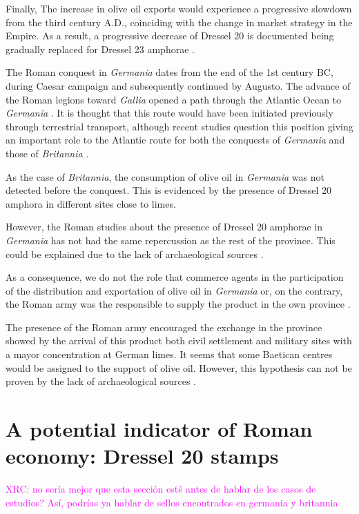 \documentclass[review]{elsarticle}
\newcommand{\memo}[2]{\textcolor{#1}{#2}}
\newcommand{\xavi}[1]{\memo{magenta}{XRC: #1\\}}
\begin{document}
Finally, The increase in olive oil exports would experience a progressive slowdown from the third century A.D., coinciding with the change in market strategy in the Empire. As a result, a progressive decrease of Dressel 20 is documented being gradually replaced for Dressel 23 amphorae \citep{rodriguez1991aceite,millet_anforas_1998}.


The Roman conquest in \textit{Germania} dates from the end of the 1st century BC, during Caesar campaign and subsequently continued by Augusto. The advance of the Roman legions toward \textit{Gallia} opened a path through the Atlantic Ocean to \textit{Germania} \citep{remesal_annona_1986,
remesal_baetica_2002}. It is thought that this route would have been initiated previously through terrestrial transport, although recent studies question this position giving an important role to the Atlantic route for both the conquests of \textit{Germania} and those of \textit{Britannia} \citep{remesal_germn_2010,rubio-campillo_ecology_2018}.

As the case of \textit{Britannia}, the consumption of olive oil in \textit{Germania} was not detected before the conquest. This is evidenced by the presence of Dressel 20 amphora in different sites close to limes. 

However, the Roman studies about the presence of Dressel 20 amphorae in \textit{Germania} has not had the same repercussion as the rest of the province. This could be explained due to the lack of archaeological sources \citep{horacio2010llegada}.
  

As a consequence, we do not the role that commerce agents in the participation of the distribution and exportation of olive oil in \textit{Germania} or, on the contrary, the Roman army was the responsible to supply the product in the own province \citep[156]{remesal_germn_2010}. 

The presence of the Roman army encouraged the exchange in the province showed by the arrival of this product both civil settlement and military sites with a mayor concentration at German limes. It seems that some Baetican centres would be assigned to the support of olive oil. However, this hypothesis can not be proven by the lack of archaeological sources \citep[125]{remesal_concierto}. 


\section{A potential indicator of Roman economy: Dressel 20 stamps}
\xavi{no sería mejor que esta sección esté antes de hablar de los casos de estudios? Así, podrías ya hablar de sellos encontrados en germania y britannia}
\end{document}
